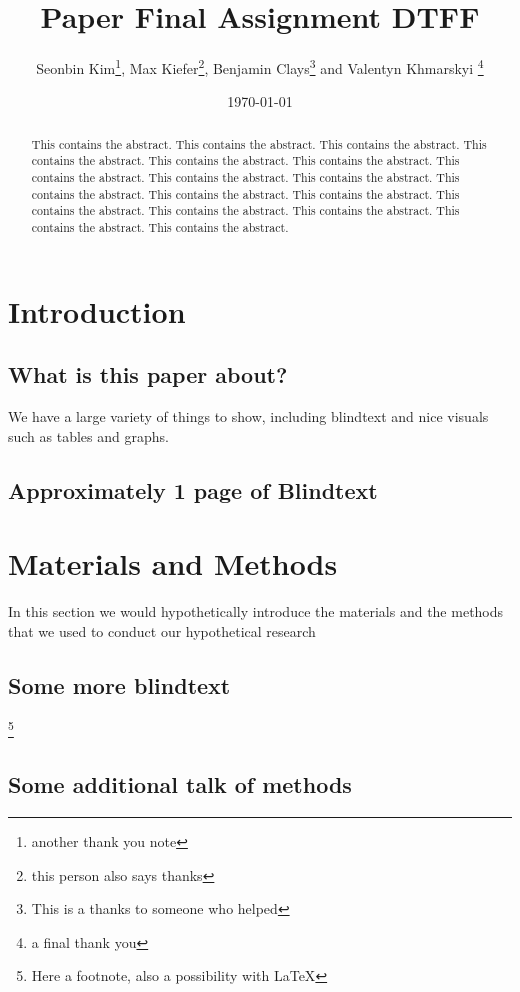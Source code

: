 \documentclass[titlepage]{article}
\title{Paper Final Assignment DTFF}
\author{Seonbin Kim\thanks{another thank you note}, Max Kiefer\thanks{this person also says thanks}, Benjamin Clays\thanks{This is a thanks to someone who helped} and Valentyn Khmarskyi \thanks{a final thank you}}
\date{\today}
\affil{Faculty of Business, Economics and Informatics, UZH}
\begin{document}
\maketitle

\begin{abstract}
This contains the abstract. This contains the abstract. This contains the abstract. This contains the abstract. This contains the abstract. This contains the abstract. This contains the abstract. This contains the abstract. This contains the abstract. This contains the abstract. This contains the abstract. This contains the abstract. This contains the abstract. This contains the abstract. This contains the abstract. This contains the abstract. This contains the abstract.
\end{abstract}

\tableofcontents

\newpage

\section{Introduction}
\subsection{What is this paper about?}
We have a large variety of things to show, including blindtext and nice visuals such as tables and graphs.
\subsection{Approximately 1 page of Blindtext}
\blindtext[1]
\par
\blindtext[2]
\par
\blindtext[2]
\par
\blindtext[1]

\section{Materials and Methods}
In this section we would hypothetically introduce the materials and the methods that we used to conduct our hypothetical research
\subsection{Some more blindtext}
\blindtext[1]\footnote{Here a footnote, also a possibility with LaTeX}
\blindtext[1]
\subsection{Some additional talk of methods}
\blindtext[1]
\end{document}
